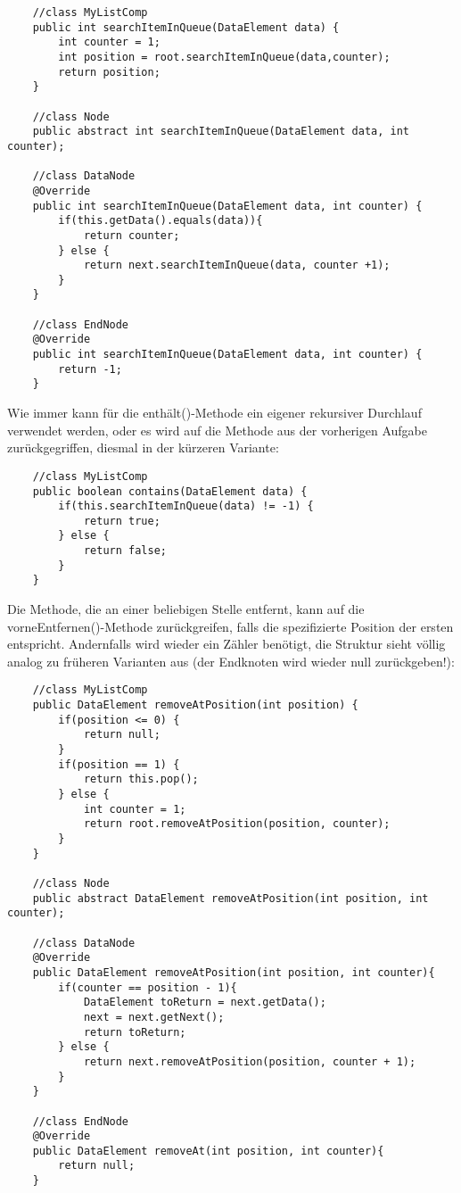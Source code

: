 \documentclass{article}
\begin{document}
\begin{verbatim}
    //class MyListComp
    public int searchItemInQueue(DataElement data) {
        int counter = 1;
        int position = root.searchItemInQueue(data,counter);
        return position;
    }

    //class Node 
    public abstract int searchItemInQueue(DataElement data, int counter);

    //class DataNode 
    @Override
    public int searchItemInQueue(DataElement data, int counter) {
        if(this.getData().equals(data)){
            return counter;
        } else {
            return next.searchItemInQueue(data, counter +1);
        }
    }

    //class EndNode 
    @Override
    public int searchItemInQueue(DataElement data, int counter) {
        return -1;
    }
\end{verbatim}
Wie immer kann für die enthält()-Methode ein eigener rekursiver Durchlauf verwendet werden, oder es wird auf die Methode aus der vorherigen Aufgabe zurückgegriffen, diesmal in der kürzeren Variante: 
\begin{verbatim}
    //class MyListComp 
    public boolean contains(DataElement data) {
        if(this.searchItemInQueue(data) != -1) {
            return true;
        } else {
            return false;
        }
    }
\end{verbatim}
Die Methode, die an einer beliebigen Stelle entfernt, kann auf die vorneEntfernen()-Methode zurückgreifen, falls die spezifizierte Position der ersten entspricht. Andernfalls wird wieder ein Zähler benötigt, die Struktur sieht völlig analog zu früheren Varianten aus (der Endknoten wird wieder null zurückgeben!): 
\begin{verbatim}
    //class MyListComp 
    public DataElement removeAtPosition(int position) {
        if(position <= 0) {
            return null;
        }
        if(position == 1) {
            return this.pop();
        } else {
            int counter = 1;
            return root.removeAtPosition(position, counter);
        }
    }

    //class Node 
    public abstract DataElement removeAtPosition(int position, int counter);

    //class DataNode 
    @Override
    public DataElement removeAtPosition(int position, int counter){
        if(counter == position - 1){
            DataElement toReturn = next.getData();
            next = next.getNext();
            return toReturn; 
        } else {
            return next.removeAtPosition(position, counter + 1);
        }
    }

    //class EndNode 
    @Override
    public DataElement removeAt(int position, int counter){
        return null;
    }
\end{verbatim}
\end{document}
